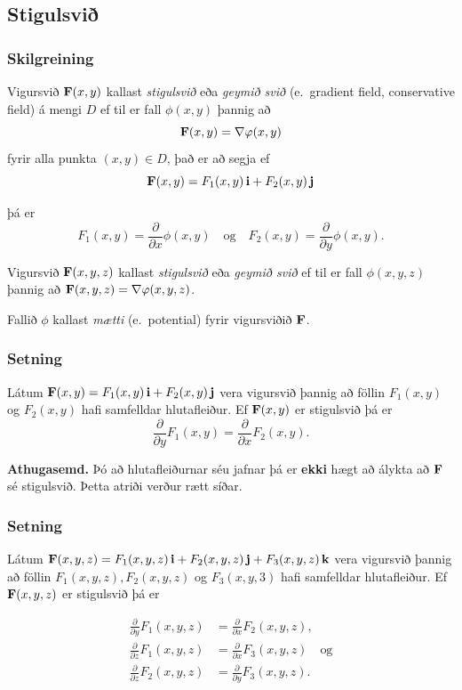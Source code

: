\subsection{Stigulsvið} 

\subsubsection{Skilgreining }
Vigursvið $\mbox{${\bf F}$}(x,y)$ kallast {\em stigulsvið} eða {\em geymið svið}
(e.~gradient field, conservative  field) á mengi $D$ ef til er fall $\phi(x,y)$ þannig að $$\mbox{${\bf F}$}(x,y)=\nabla\varphi(x,y)$$ fyrir alla punkta $(x,y)\in D$, það er að segja ef 
$$\mbox{${\bf F}$}(x,y)=F_1(x,y)\,\mbox{${\bf i}$}+F_2(x,y)\,\mbox{${\bf j}$}$$ 

þá er $$F_1(x,y)=\frac{\partial}{\partial x}\phi(x,y) \quad \text{og}\quad  F_2(x,y)=\frac{\partial}{\partial y}\phi(x,y).$$

Vigursvið $\mbox{${\bf F}$}(x,y,z)$ kallast {\em stigulsvið} eða  {\em geymið svið} ef til er fall $\phi(x,y,z)$ þannig að $\mbox{${\bf F}$}(x,y,z)=\nabla\varphi(x,y,z)$. 

\medskip
Fallið $\phi$ kallast {\em mætti} (e.~potential) fyrir vigursviðið $\mbox{${\bf F}$}$.



\subsubsection{Setning }
 Látum $\mbox{${\bf F}$}(x,y)=F_1(x,y)\,\mbox{${\bf i}$}+F_2(x,y)\,\mbox{${\bf j}$}$ vera vigursvið þannig að föllin $F_1(x,y)$ og $F_2(x,y)$ hafi samfelldar hlutafleiður.  Ef $\mbox{${\bf F}$}(x,y)$ er stigulsvið þá er 
$$\frac{\partial}{\partial y}F_1(x,y)=
\frac{\partial}{\partial x}F_2(x,y).$$

\smallskip

{\bf Athugasemd.}  Þó að hlutafleiðurnar séu jafnar
þá er {\bf ekki} hægt að álykta að $\mbox{${\bf F}$}$ sé stigulsvið.  Þetta
atriði verður rætt síðar.
 



\subsubsection{Setning }
Látum
$\mbox{${\bf F}$}(x,y,z)=F_1(x,y,z)\,\mbox{${\bf i}$}+F_2(x,y,z)\,\mbox{${\bf j}$}+F_3(x,y,z)\,\mbox{${\bf k}$}$ vera vigursvið
þannig að föllin $F_1(x,y,z), F_2(x,y,z)$ og $F_3(x,y,3)$ hafi
samfelldar hlutafleiður.  Ef $\mbox{${\bf F}$}(x,y,z)$ er stigulsvið þá er  

\begin {align*}
\frac{\partial}{\partial y}F_1(x,y,z) &=
\frac{\partial}{\partial x}F_2(x,y,z), \\
\frac{\partial}{\partial z}F_1(x,y,z) &=
\frac{\partial}{\partial x}F_3(x,y,z) \quad \text{og} \\
\frac{\partial}{\partial z}F_2(x,y,z)&=
\frac{\partial}{\partial y}F_3(x,y,z).
\end {align*}





